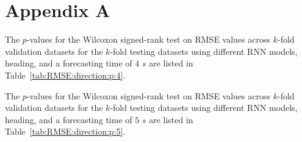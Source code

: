 \appendix
\section{Appendix A}
\label{appA}

The $p$-values for the Wilcoxon signed-rank test on RMSE values across $k$-fold validation datasets for the $k$-fold testing datasets using different RNN models, heading, and a forecasting time of $4$ $s$ are listed in Table~\ref{tab:RMSE:direction:p:4}.

\begin{table}[!ht]
	\centering
	\caption{The $p$-values for the Wilcoxon signed-rank test on RMSE values across $k$-fold validation datasets for the $k$-fold testing datasets using different RNN models, heading, and a forecasting time of $4$ $s$.}
	\label{tab:RMSE:direction:p:4}
\end{table}

The $p$-values for the Wilcoxon signed-rank test on RMSE values across $k$-fold validation datasets for the $k$-fold testing datasets using different RNN models, heading, and a forecasting time of $5$ $s$ are listed in Table~\ref{tab:RMSE:direction:p:5}.

